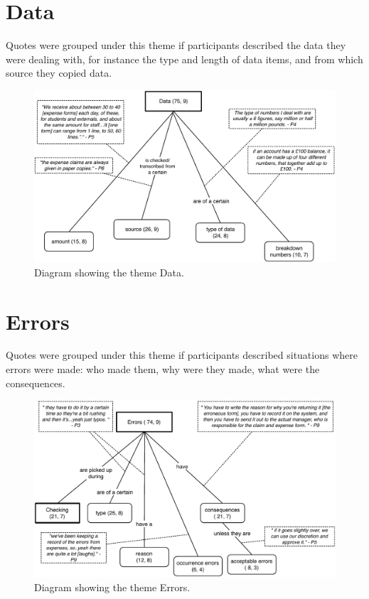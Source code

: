 \newpage

\section{Data}
Quotes were grouped under this theme if participants described the data they were dealing with, for instance the type and length of data items, and from which source they copied data.

\begin{figure}[!ht]
\centering
\includegraphics[width=\textwidth]{images/ch12/Data.pdf}
\caption[Study 1 Data diagram]{Diagram showing the theme Data.}
\vspace{-9pt}
\label{fig:ch3_data}
\end{figure}

\section{Errors}
Quotes were grouped under this theme if participants described situations where errors were made: who made them, why were they made, what were the consequences. 

\begin{figure}[!ht]
\centering
\includegraphics[width=\textwidth]{images/ch12/Errors.pdf}
\caption[Study 1 Errors diagram]{Diagram showing the theme Errors.}
\vspace{-9pt}
\label{fig:ch3_errors}
\end{figure}

